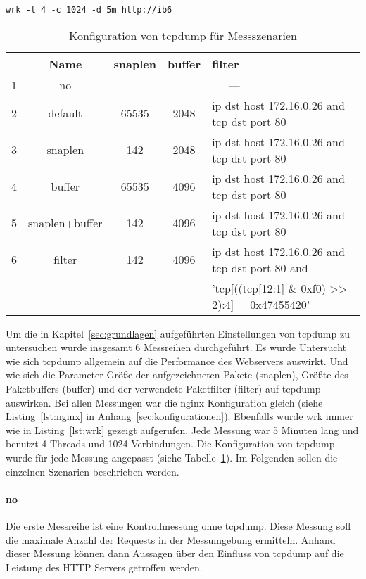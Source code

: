 \begin{lstlisting}[caption={Aufruf von wrk},label=lst:wrk]
wrk -t 4 -c 1024 -d 5m http://ib6
\end{lstlisting}

\begin{table}
  \centering
  \bgroup
  \def\arraystretch{1.3}
  \begin{tabular}{ccccp{7.6cm}}
      & \textbf{Name} & \textbf{snaplen} & \textbf{buffer} & \textbf{filter} \\\hline\hline
      1 & no & \multicolumn{3}{c}{---} \\\hline
      2 & default & 65535 & 2048 & ip dst host 172.16.0.26 and tcp dst port 80 \\\hline
      3 & snaplen & 142 & 2048 & ip dst host 172.16.0.26 and tcp dst port 80 \\\hline
      4 & buffer  & 65535 & 4096 & ip dst host 172.16.0.26 and tcp dst port 80 \\\hline
      5 & snaplen+buffer & 142 & 4096 & ip dst host 172.16.0.26 and tcp dst port 80 \\\hline
      6 & filter  & 142 & 4096 & ip dst host 172.16.0.26 and tcp dst port 80 and \\
        &      & & & 'tcp[((tcp[12:1] \& 0xf0) >> 2):4] = 0x47455420' \\
  \end{tabular}
  \egroup
  \caption{Konfiguration von tcpdump für Messszenarien}\label{tab:szenarien}
\end{table}

Um die in Kapitel~\ref{sec:grundlagen} aufgeführten Einstellungen von tcpdump
zu untersuchen wurde insgesamt 6 Messreihen durchgeführt. Es wurde Untersucht
wie sich tcpdump allgemein auf die Performance des Webservers auswirkt. Und wie
sich die Parameter Größe der aufgezeichneten Pakete (snaplen), Größte des
Paketbuffers (buffer) und der verwendete Paketfilter (filter) auf tcpdump
auswirken. Bei allen Messungen war die nginx Konfiguration gleich (siehe
Listing~\ref{lst:nginx} in Anhang~\ref{sec:konfigurationen}).  Ebenfalls
wurde wrk immer wie in Listing~\ref{lst:wrk} gezeigt aufgerufen. Jede Messung
war 5 Minuten lang und benutzt 4 Threads und 1024 Verbindungen. Die
Konfiguration von tcpdump wurde für jede Messung angepasst (siehe
Tabelle~\ref{tab:szenarien}). Im Folgenden sollen die einzelnen Szenarien
beschrieben werden.

\paragraph{no} Die erste Messreihe ist eine Kontrollmessung ohne tcpdump. Diese
Messung soll die maximale Anzahl der Requests in der Messumgebung ermitteln.
Anhand dieser Messung können dann Aussagen über den Einfluss von tcpdump auf
die Leistung des HTTP Servers getroffen werden.

